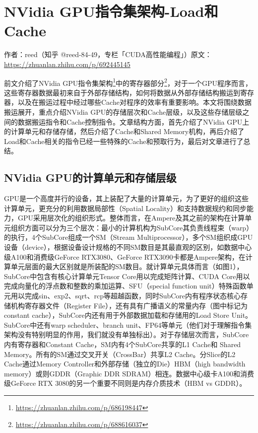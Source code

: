 \chapter{NVidia GPU指令集架构-Load和Cache}

\begin{center}\small 作者：reed（知乎 @reed-84-49，专栏「CUDA高性能编程」）\quad 原文：\url{https://zhuanlan.zhihu.com/p/692445145}\end{center}

前文介绍了NVidia GPU指令集架构\footnote{\url{https://zhuanlan.zhihu.com/p/686198447}}中的寄存器部分\footnote{\url{https://zhuanlan.zhihu.com/p/688616037}}，对于一个GPU程序而言，这些寄存器数据最初来自于外部存储结构，如何将数据从外部存储结构搬运到寄存器，以及在搬运过程中经过哪些Cache对程序的效率有重要影响。本文将围绕数据搬运展开，重点介绍NVidia GPU的存储层次和Cache层级，以及这些存储层级之间的数据搬运指令和Cache控制指令。文章结构方面，首先介绍了NVidia GPU上的计算单元和存储存储，然后介绍了Cache和Shared Memory机构，再后介绍了Load和Cache相关的指令已经一些特殊的Cache和预取行为，最后对文章进行了总结。

\section{NVidia GPU的计算单元和存储层级}

GPU是一个高度并行的设备，其上装配了大量的计算单元，为了更好的组织这些计算单元，更充分的利用数据局部性（Spatial Locality）和支持数据规约和同步能力，GPU采用层次化的组织形式。整体而言，在Ampere及其之前的架构在计算单元组织方面可以分为三个层次：最小的计算机构为SubCore其负责线程束（warp）的执行，4个SubCore组成一个SM（Stream Multiprocessor），多个SM组织成GPU设备（device），根据设备设计规格的不同SM数目是其最直观的区别，如数据中心级A100和消费级GeForce RTX3080、GeForce RTX3090卡都是Ampere架构，在计算单元层面的最大区别就是所装配的SM数目。就计算单元具体而言（如图1），SubCore中包含有核心计算单元Tensor Core用以完成矩阵计算、CUDA Core用以完成向量化的浮点数和整数的乘加运算、SFU（special function unit）特殊函数单元用以完成sin、exp2、sqrt、rcp等超越函数，同时SubCore内有程序状态核心存储机构寄存器文件（Register File），还有具有广播语义的常量内存（图中标记为constant cache），SubCore内还有用于外部数据加载和存储用的Load Store Unit。SubCore中还有warp scheduler、branch unit、FP64等单元（他们对于理解指令集架构没有特别明显的作用，我们就没有单独标出）。对于存储层次而言，SubCore内有寄存器和Constant Cache，SM内有4个SubCore共享的L1 Cache和 Shared Memory。所有的SM通过交叉开关（CrossBar）共享L2 Cache。分Slice的L2 Cache通过Memory Controller和外部存储（独立的Die）HBM（high bandwidth memory）或则GDDR（Graphic DDR SDRAM）相连。数据中心级卡A100和消费级GeForce RTX 3080的另一个重要不同则是内存介质技术（HBM vs GDDR）。

